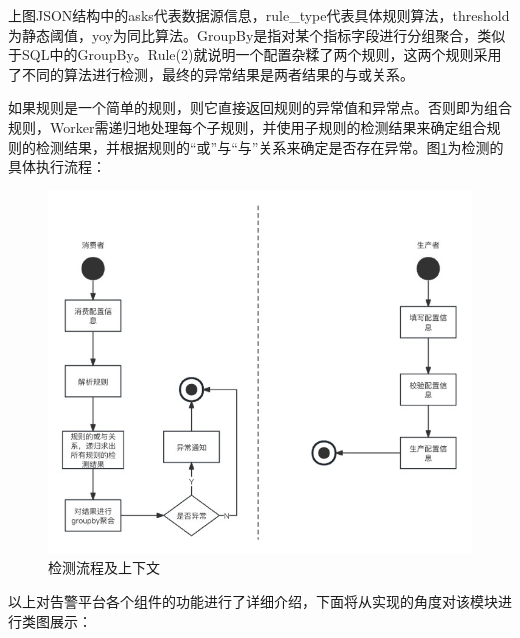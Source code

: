 上图JSON结构中的asks代表数据源信息，rule\_type代表具体规则算法，threshold为静态阈值，yoy为同比算法。GroupBy是指对某个指标字段进行分组聚合，类似于SQL中的GroupBy。Rule(2)就说明一个配置杂糅了两个规则，这两个规则采用了不同的算法进行检测，最终的异常结果是两者结果的与或关系。

如果规则是一个简单的规则，则它直接返回规则的异常值和异常点。否则即为组合规则，Worker需递归地处理每个子规则，并使用子规则的检测结果来确定组合规则的检测结果，并根据规则的“或”与“与”关系来确定是否存在异常。图\ref{jianceliuchengshangxia}为检测的具体执行流程：
\newpage
 \begin{figure}[h!]
  \centering
  \includegraphics[width=5in]{figure/chapter4/检测流程及上下文.jpg}
  \caption{检测流程及上下文}\label{jianceliuchengshangxia}
\end{figure}


以上对告警平台各个组件的功能进行了详细介绍，下面将从实现的角度对该模块进行类图展示：


